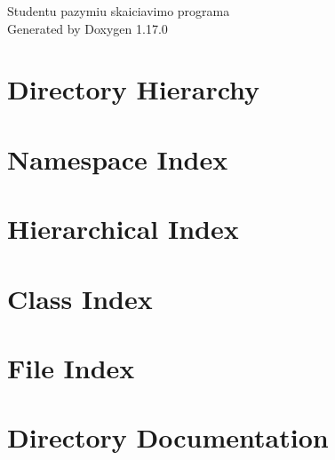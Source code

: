 \documentclass[twoside]{book}
\newcommand{\+}{\discretionary{\mbox{\scriptsize$\hookleftarrow$}}{}{}}
\newcommand{\clearemptydoublepage}{%
    \newpage{\pagestyle{empty}\cleardoublepage}%
  }
\begin{document}
  \raggedbottom
    \hypersetup{pageanchor=false,
                bookmarksnumbered=true,
                pdfencoding=unicode
               }
  \begin{titlepage}
  \vspace*{7cm}
  \begin{center}%
  {\Large Studentu pazymiu skaiciavimo programa}\\
  \vspace*{1cm}
  {\large Generated by Doxygen 1.17.0}\\
  \end{center}
  \end{titlepage}
  \clearemptydoublepage
  \tableofcontents
  \clearemptydoublepage
  \hypersetup{pageanchor=true}

\chapter{Directory Hierarchy}

\chapter{Namespace Index}

\chapter{Hierarchical Index}

\chapter{Class Index}

\chapter{File Index}

\chapter{Directory Documentation}












\end{document}
